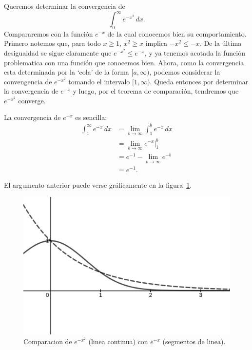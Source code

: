 \documentclass[mid,fleqn,draft,twoside]{notasdeclase}
\newcommand{\inte}[4]{\int_{#1}^{#2} #3\, d#4}
\newcommand{\inv}{^{-1}}
\begin{document}
\begin{ejem}
	Queremos determinar la convergencia de
	\[ \inte{0}{\infty}{e^{-x^2}}{x}. \]
	Compararemos con la función $e^{-x}$ de la cual conocemos bien su comportamiento. Primero notemos que, para todo $x\geq1$, $x^2\geq x$ implica $-x^2\leq -x$. De la última desigualdad se sigue claramente que $e^{-x^2}\leq e^{-x}$, y ya tenemos acotada la función problematica con una función que conocemos bien.
	Ahora, como la convergencia esta determinada por la `cola' de la forma $[a,\infty)$, podemos considerar la convengencia de $e^{-x^2}$ tomando el intervalo $[1,\infty)$. Queda entonces por determinar la convergencia de $e^{-x}$ y luego, por el teorema de comparación, tendremos que $e^{-x^2}$ converge.
	
	La convergencia de $e^{-x}$ es sencilla:
	\begin{align*}
		\inte{1}{\infty}{e^{-x}}{x} &= \lim\limits_{b\to\infty}\inte{1}{b}{e^{-x}}{x} \\ 
		&=  \lim\limits_{b\to\infty}  e^{-x} \bigg|^b_1 \\
		&= e\inv - \lim\limits_{b\to\infty} e^{-b}  \\
		&= e\inv.
	\end{align*}

	El argumento anterior puede verse gráficamente en la figura~\ref{ch0g1}.\\

\begin{center}
			\begin{figure}[H]\centering
			\includegraphics[width=.6\linewidth]{pics/g1}
			\caption{Comparacion de $e^{-x^2}$ (linea continua) con $e^{-x}$ (segmentos de linea).}\label{ch0g1}
		\end{figure}
\end{center}

\end{ejem}
\end{document}
